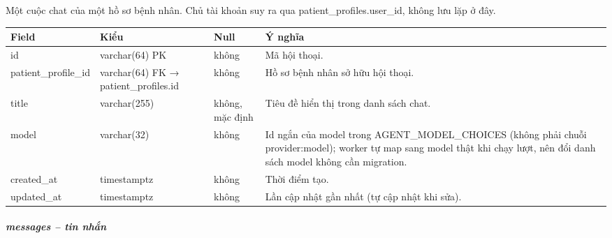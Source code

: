 Một cuộc chat của một hồ sơ bệnh nhân. Chủ tài khoản suy ra qua patient\_profiles.user\_id, không lưu lặp ở đây.
\begin{longtable}{|>{\raggedright\arraybackslash}p{0.250\dimexpr\linewidth-8\tabcolsep\relax}|>{\raggedright\arraybackslash}p{0.228\dimexpr\linewidth-8\tabcolsep\relax}|>{\raggedright\arraybackslash}p{0.272\dimexpr\linewidth-8\tabcolsep\relax}|>{\raggedright\arraybackslash}p{0.250\dimexpr\linewidth-8\tabcolsep\relax}|}
\hline
\textbf{Field} & \textbf{Kiểu} & \textbf{Null} & \textbf{Ý nghĩa} \\ \hline
\endhead
id & varchar(64) PK & không & Mã hội thoại. \\ \hline
patient\_profile\_id & varchar(64) FK → patient\_profiles.id & không & Hồ sơ bệnh nhân sở hữu hội thoại. \\ \hline
title & varchar(255) & không, mặc định & Tiêu đề hiển thị trong danh sách chat. \\ \hline
model & varchar(32) & không & Id ngắn của model trong AGENT\_MODEL\_CHOICES (không phải chuỗi provider:model); worker tự map sang model thật khi chạy lượt, nên đổi danh sách model không cần migration. \\ \hline
created\_at & timestamptz & không & Thời điểm tạo. \\ \hline
updated\_at & timestamptz & không & Lần cập nhật gần nhất (tự cập nhật khi sửa). \\ \hline
\end{longtable}

\subparagraph{messages -- tin nhắn}

